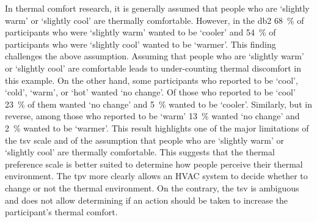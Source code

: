 In thermal comfort research, it is generally assumed that people who are `slightly warm' or `slightly cool' are thermally comfortable.
However, in the \ac{db2} \qty{68}{\percent} of participants who were `slightly warm' wanted to be `cooler' and \qty{54}{\percent} of participants who were `slightly cool' wanted to be `warmer'.
This finding challenges the above assumption.
Assuming that people who are `slightly warm' or `slightly cool' are comfortable leads to under-counting thermal discomfort in this example.
On the other hand, some participants who reported to be `cool', `cold', `warm', or `hot' wanted `no change'.
Of those who reported to be `cool' \qty{23}{\percent} of them wanted `no change' and \qty{5}{\percent} wanted to be `cooler'.
Similarly, but in reverse, among those who reported to be `warm' \qty{13}{\percent} wanted `no change' and \qty{2}{\percent} wanted to be `warmer'.
This result highlights one of the major limitations of the \ac{tsv} scale and of the assumption that people who are `slightly warm' or `slightly cool' are thermally comfortable.
This suggests that the thermal preference scale is better suited to determine how people perceive their thermal environment.
The \ac{tpv} more clearly allows an HVAC system to decide whether to change or not the thermal environment. 
On the contrary, the \ac{tsv} is ambiguous and does not allow determining if an action should be taken to increase the participant's thermal comfort.

